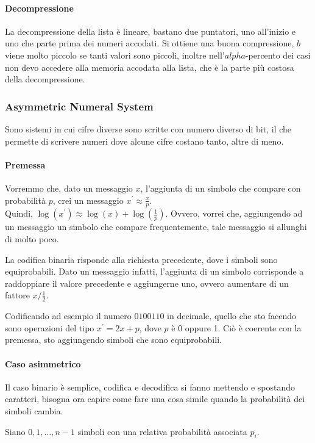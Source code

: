 \paragraph{Decompressione}
La decompressione della lista è lineare, bastano due puntatori, uno all'inizio e uno che parte 
prima dei numeri accodati.
Si ottiene una buona compressione, $b$ viene molto piccolo se tanti valori sono piccoli, inoltre nell'$alpha$-percento dei casi 
non devo accedere alla memoria accodata alla lista, che è la parte più 
costosa della decompressione.

\subsubsection{Asymmetric Numeral System}
Sono sistemi in cui cifre diverse sono scritte con numero diverso di bit, 
il che permette di scrivere numeri dove alcune cifre costano tanto, 
altre di meno.

\paragraph{Premessa}
Vorremmo che, dato un messaggio $x$, l'aggiunta di un simbolo 
che compare con probabilità $p$, crei un messaggio $x^\prime \approx \frac{x}{p}$.\\
Quindi, $\log(x^\prime) \approx \log(x) + \log(\frac{1}{p})$.
Ovvero, vorrei che, aggiungendo ad un messaggio un simbolo che compare 
frequentemente, tale messaggio si allunghi di molto poco.

La codifica binaria risponde alla richiesta precedente, dove i simboli 
sono equiprobabili.
Dato un messaggio infatti, l'aggiunta di un simbolo corrisponde a raddoppiare il valore precedente e aggiungerne uno, ovvero 
aumentare di un fattore $x/\frac{1}{2}$.

Codificando ad esempio il numero $0100110$ in decimale, quello che sto facendo sono operazioni del tipo 
$x^\prime = 2x + p$, dove $p$ è 0 oppure 1. Ciò è coerente con la premessa, 
sto aggiungendo simboli che sono equiprobabili.

\paragraph{Caso asimmetrico}
Il caso binario è semplice, codifica e decodifica si fanno 
mettendo e spostando caratteri, bisogna ora capire come fare una cosa 
simile quando la probabilità dei simboli cambia.

Siano $0,1, \dots, n-1$ simboli con una relativa probabilità associata  $p_i$.

